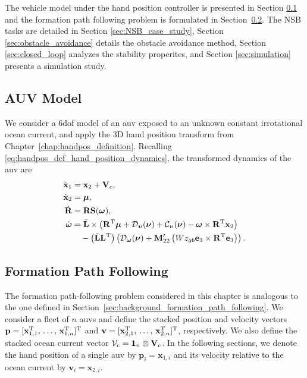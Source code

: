The vehicle model under the hand position controller is presented in Section \ref{sec:vehicle_model} and the formation path following problem is formulated in Section~\ref{sec:formation_path_following}. The NSB tasks are detailed in Section \ref{sec:NSB_case_study}, Section \ref{sec:obstacle_avoidance} details the obstacle avoidance method, Section \ref{sec:closed_loop} analyzes the stability properites, and Section \ref{sec:simulation} presents a simulation study.

\subsection{AUV Model}\label{sec:vehicle_model}
We consider a 6\gls{dof} model of an \gls{auv} exposed to an unknown constant irrotational ocean current, and apply the 3D hand position transform from Chapter~\ref{chap:handpos_definition}.
Recalling \eqref{eq:handpos_def_hand_position_dynamics}, the transformed dynamics of the \gls{auv} are
\begin{subequations}\label{eq:linearized_system}
    \begin{align}
        \dot{\mathbf{x}}_1 &= \mathbf{x}_2 + \mathbf{V}_c,\\
        \dot{\mathbf{x}}_2 &= \bm{\mu},\\
        \dot{\mathbf{R}} &=  \mathbf{R} \mathbf{S}(\bm{\omega}),\\
        \dot{\bm{\omega}} &= \Bar{\mathbf{L}} \times \left(\mathbf{R}^{\mathrm{T}}\bm{\mu} + \mathcal{D}_{\bm{\upsilon}}(\bm{\nu}) + \mathcal{C}_{\bm{\upsilon}}(\bm{\nu}) - \bm{\omega} \times \mathbf{R}^{\mathrm{T}} \mathbf{x}_2\right) \label{eq:internal_dynamics} \\
            & \quad - \left(\Bar{\mathbf{L}}\mathbf{L}^{\mathrm{T}}\right) \left(\mathcal{D}_{\bm{\omega}}(\bm{\nu}) + \mathbf{M}_{22}^{\prime}\left(Wz_{gb} \mathbf{e}_3 \times \mathbf{R}^{\mathrm{T}} \mathbf{e}_3\right)\right). \nonumber
    \end{align}
\end{subequations}

\subsection{Formation Path Following}\label{sec:formation_path_following}
The formation path-following problem considered in this chapter is analogous to the one defined in Section~\ref{sec:background_formation_path_following}.
We consider a fleet of $n$ \glspl{auv} and define the stacked position and velocity vectors $\mathbf{p} = [\mathbf{x}_{1,1}^{\mathrm{T}}, \, \ldots,\, \mathbf{x}_{1,n}^{\mathrm{T}}]^{\mathrm{T}}$ and $\mathbf{v} = [\mathbf{x}_{2,1}^{\mathrm{T}}, \, \ldots,\, \mathbf{x}_{2,n}^{\mathrm{T}}]^{\mathrm{T}}$, respectively. We also define the stacked ocean current vector $\mathcal{V}_c = \mathbf{1}_{n} \otimes \mathbf{V}_c$. In the following sections, we denote the hand position of a single \gls{auv} by $\mathbf{p}_i = \mathbf{x}_{1,i}$ and its velocity relative to the ocean current by $\mathbf{v}_i = \mathbf{x}_{2,i}$.

